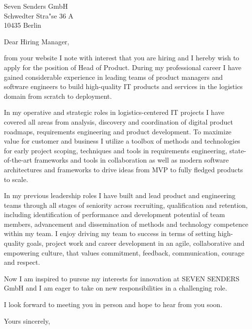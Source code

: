 \documentclass[10pt,a4paper]{dinbrief}
\date{\today}
\begin{document}
 
\begin{letter}  
{%
    Seven Senders GmbH\\
    Schwedter Stra"se 36 A\\
    10435 Berlin
}
\subject{\bf Application Head of Product}
\opening{Dear Hiring Manager,}

from your website I note with interest that you are hiring and I hereby wish to apply for the position of Head of Product. During my professional career I have gained considerable experience in leading teams of product managers and software engineers to build high-quality IT products and services in the logistics domain from scratch to deployment.

In my operative and strategic roles in logistics-centered IT projects I have covered all areas from analysis, discovery and coordination of digital product roadmaps, requirements engineering and product development. To maximize value for customer and business I utilize a toolbox of methods and technologies for early project scoping, techniques and tools in requirements engineering, state-of-the-art frameworks and tools in collaboration as well as modern software architectures and frameworks to drive ideas from MVP to fully fledged products to scale.

In my previous leadership roles I have built and lead product and engineering teams through all stages of seniority across recruiting, qualification and retention, including identification of performance and development potential of team members, advancement and dissemination of methods and technology competence within my team. I enjoy driving my team to success in terms of setting high-quality goals, project work and career development in an agile, collaborative and empowering culture, that values commitment, feedback, communication, courage and respect.

Now I am inspired to pursue my interests for innovation at SEVEN SENDERS GmbH and I am eager to take on new responsibilities in a challenging role.

I look forward to meeting you in person and hope to hear from you soon.

\closing{Yours sincerely,}
\end{letter}
\end{document}
